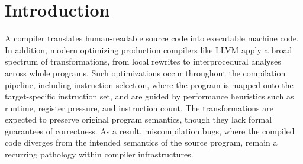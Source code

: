 \documentclass[review, anonymous, acmsmall, screen]{acmart}
\begin{document}
\section{Introduction}
A compiler translates human-readable source code into executable machine code. In addition, modern 
optimizing production compilers like LLVM apply a broad spectrum of transformations, from local 
rewrites to interprocedural analyses across whole programs. Such optimizations occur throughout the 
compilation pipeline, including instruction selection, where the program is mapped onto the target-specific
instruction set, and are guided by performance heuristics such as runtime, register pressure, and instruction
count. The transformations are expected to preserve  original program semantics, though they lack formal 
guarantees of correctness. As a result, miscompilation bugs, where the compiled code diverges from the
intended semantics of the source program, remain a recurring pathology within compiler infrastructures.
\end{document}
